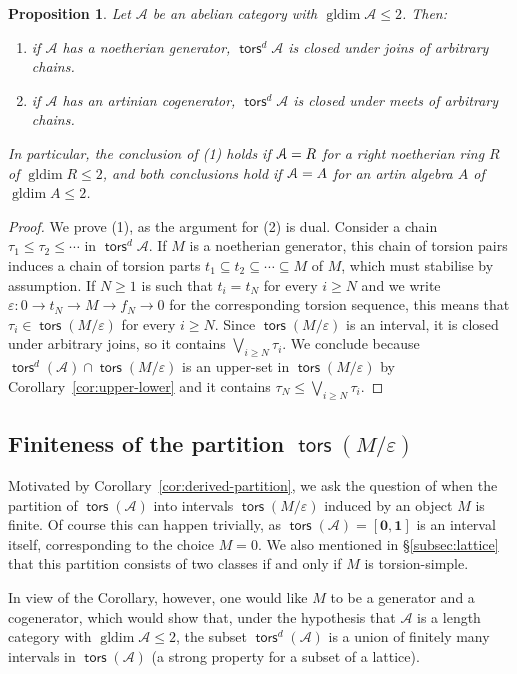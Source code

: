 \documentclass[a4paper,11pt]{amsart}
\theoremstyle{plain}
\newtheorem{prop}[thm]{Proposition}
\theoremstyle{definition}
\newcommand{\Acal}{\mathcal{A}} \newcommand{\Bcal}{\mathcal{B}} \newcommand{\Ccal}{\mathcal{C}}
\renewcommand{\epsilon}{\varepsilon}
\DeclareMathOperator{\gldim}{gldim}
\DeclareMathOperator{\tors}{\mathsf{tors}}
\let\mod\relax
\DeclareMathOperator{\mod}{\mathsf{mod}}
\begin{document}
\begin{prop}\label{prop:gldim2-chains}
	Let $\Acal$ be an abelian category with $\gldim\Acal\leq2$. Then:
	\begin{enumerate}
		\item if $\Acal$ has a noetherian generator, $\tors^d\Acal$ is
			closed under joins of arbitrary chains.
		\item if $\Acal$ has an artinian cogenerator, $\tors^d\Acal$ is
			closed under meets of arbitrary chains.
	\end{enumerate}
	In particular, the conclusion of (1) holds if $\Acal=\mod R$ for a
	right noetherian ring $R$ of $\gldim R\leq 2$, and both conclusions hold if
	$\Acal=\mod A$ for an artin algebra $A$ of $\gldim A\leq 2$.
\end{prop}

\begin{proof}
	We prove (1), as the argument for (2) is dual.
	Consider a chain $\tau_1\leq \tau_2\leq\cdots$ in $\tors^d\Acal$. If $M$ is a
	noetherian generator, this chain of torsion pairs induces a chain of torsion parts
	$t_1\subseteq t_2\subseteq\cdots \subseteq M$ of $M$, which must stabilise by
	assumption. If $N\geq 1$ is such that $t_i=t_N$ for every $i\geq N$ and we
	write $\epsilon\colon 0\to t_N\to M\to f_N\to 0$ for the corresponding torsion
	sequence, this means that $\tau_i\in\tors(M/\epsilon)$ for every $i\geq N$.
	Since $\tors(M/\epsilon)$ is an interval, it is closed under arbitrary joins,
	so it contains $\bigvee_{i\geq N}\tau_i$.
	We conclude because $\tors^d(\Acal)\cap \tors(M/\epsilon)$ is an upper-set
	in $\tors(M/\epsilon)$ by Corollary~\ref{cor:upper-lower} and it contains $\tau_N\leq \bigvee_{i\geq
	N}\tau_i$.
\end{proof}

\subsection{Finiteness of the partition $\tors(M/\epsilon)$}

Motivated by Corollary~\ref{cor:derived-partition}, we ask the question of when
the partition of $\tors(\Acal)$ into intervals $\tors(M/\epsilon)$ induced by an
object $M$ is finite. Of course this can happen trivially, as
$\tors(\Acal)=[\mathbf{0},\mathbf{1}]$ is an interval itself, corresponding to
the choice $M=0$. We also mentioned in \S\ref{subsec:lattice} that this
partition consists of two classes if and only if $M$ is torsion-simple.

In view of the Corollary, however, one would like $M$ to be a generator
and a cogenerator, which would show that, under the hypothesis that $\Acal$ is a
length category with
$\gldim\Acal\leq 2$, the subset $\tors^d(\Acal)$ is a union of
finitely many intervals in $\tors(\Acal)$ (a strong property for a subset of a
lattice).
\end{document}
